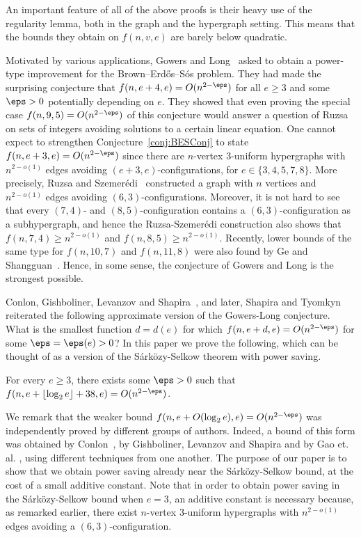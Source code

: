 An important feature of all of the above proofs is their heavy use of the regularity lemma, both in the graph and the hypergraph setting. This means that the bounds they obtain on $f(n, v, e)$ are barely below quadratic. 

Motivated by various applications, Gowers and Long~\cite{GL21} asked to obtain a power-type improvement for the Brown--Erd\H os--S\'os problem.
They had made the surprising conjecture that $f(n, e+4, e)=O(n^{2-\eps})$ for all $e\geq 3$ and some $\eps>0$ potentially depending on $e$. 
They showed that even proving the special case $f(n,9,5)=O(n^{2-\eps})$ of this conjecture would answer a question of Ruzsa~\cite{ruzsa1993solving} on sets of integers avoiding solutions to a certain linear equation.
One cannot expect to strengthen Conjecture~\ref{conj:BESConj} to state $f(n, e+3, e)=O(n^{2-\eps})$ since there are $n$-vertex $3$-uniform hypergraphs with $n^{2-o(1)}$ edges avoiding $(e+3, e)$-configurations, for $e\in \{3, 4, 5, 7, 8\}$. More precisely, Ruzsa and Szemer\'edi~\cite{RS76} constructed a graph with $n$ vertices and $n^{2-o(1)}$ edges avoiding $(6, 3)$-configurations. Moreover, it is not hard to see that every $(7, 4)$- and $(8, 5)$-configuration contains a $(6, 3)$-configuration as a subhypergraph, and hence the Ruzsa-Szemer\'edi construction also shows that $f(n, 7, 4)\geq n^{2-o(1)}$ and $f(n, 8, 5)\geq n^{2-o(1)}$. Recently, lower bounds of the same type for $f(n, 10, 7)$ and $f(n, 11, 8)$ were also found by Ge and Shangguan~\cite{GS21}. Hence, in some sense, the conjecture of Gowers and Long is the strongest possible.

Conlon, Gishboliner, Levanzov and Shapira~\cite{CGLS23}, and later, Shapira and Tyomkyn~\cite{ST23} reiterated the following approximate version of the Gowers-Long conjecture. 
What is the smallest function $d=d(e)$ for which $f(n, e+d, e)=O(n^{2-\eps})$ for some $\eps = \eps(e)>0$? In this paper we prove the following, which can be thought of as a version of the S\'ark\"ozy-Selkow theorem with power saving.

\begin{theorem}\label{thm:power saving}
For every $e \ge 3$, there exists some $\eps>0$ such that $f(n, e+\lfloor \log_2 e\rfloor+38, e)=O(n^{2-\eps})$.
\end{theorem}

We remark that the weaker bound $f(n,e+O(\log_2 e),e)=O(n^{2-\eps})$ was independently proved by different groups of authors. Indeed, a bound of this form was obtained by Conlon~\cite{Conprivate}, by Gishboliner, Levanzov and Shapira \cite{GLSprivate} and by Gao et. al. \cite{Gaoetal}, using different techniques from one another. The purpose of our paper is to show that we obtain power saving already near the S\'ark\"ozy-Selkow bound, at the cost of a small additive constant. Note that in order to obtain power saving in the S\'ark\"ozy-Selkow bound when $e = 3$, an additive constant is necessary because, as remarked earlier, there exist $n$-vertex $3$-uniform hypergraphs with $n^{2-o(1)}$ edges avoiding a $(6, 3)$-configuration.

